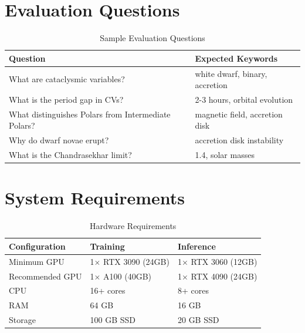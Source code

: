 \documentclass[11pt,a4paper]{article}
\begin{document}
\section{Evaluation Questions}\label{app:questions}

\begin{table}[htbp]
\centering
\caption{Sample Evaluation Questions}
\begin{tabular}{p{8cm}p{5cm}}
\toprule
\textbf{Question} & \textbf{Expected Keywords} \\
\midrule
What are cataclysmic variables? & white dwarf, binary, accretion \\
What is the period gap in CVs? & 2-3 hours, orbital evolution \\
What distinguishes Polars from Intermediate Polars? & magnetic field, accretion disk \\
Why do dwarf novae erupt? & accretion disk instability \\
What is the Chandrasekhar limit? & 1.4, solar masses \\
\bottomrule
\end{tabular}
\end{table}

\section{System Requirements}\label{app:requirements}

\begin{table}[htbp]
\centering
\caption{Hardware Requirements}
\begin{tabular}{lll}
\toprule
\textbf{Configuration} & \textbf{Training} & \textbf{Inference} \\
\midrule
Minimum GPU & 1$\times$ RTX 3090 (24GB) & 1$\times$ RTX 3060 (12GB) \\
Recommended GPU & 1$\times$ A100 (40GB) & 1$\times$ RTX 4090 (24GB) \\
CPU & 16+ cores & 8+ cores \\
RAM & 64 GB & 16 GB \\
Storage & 100 GB SSD & 20 GB SSD \\
\bottomrule
\end{tabular}
\end{table}
\end{document}
